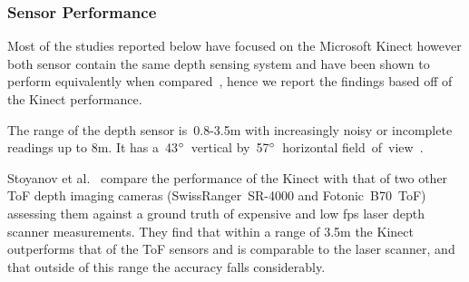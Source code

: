 \documentclass[11pt]{article} %
\begin{document}

\subsubsection{Sensor Performance}
\label{sec:senPerf}

Most of the studies reported below have focused on the Microsoft Kinect however both sensor contain the same depth sensing system and have been shown to perform equivalently when compared~\cite{Gonzalez-Jorge2013}, hence we report the findings based off of the Kinect performance.

The range of the depth sensor is~0.8-3.5m with increasingly noisy or incomplete readings up to 8m. It has a~43$\degree$~vertical by~57$\degree$~horizontal field~of~view~\cite{Han2013}.

Stoyanov et al.~\cite{StoyanovTodorandLouloudiAthanasiaandAndreassonHenrikandLilienthal2011a} compare the performance of the Kinect with that of two other ToF depth imaging cameras (SwissRanger~SR-4000 and Fotonic~B70~ToF) assessing them against a ground truth of expensive and low fps laser depth scanner measurements. They find that within a range of 3.5m the Kinect outperforms that of the ToF sensors and is comparable to the laser scanner, and that outside of this range the accuracy falls considerably.
\end{document}
